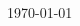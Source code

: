 \documentclass[10pt,A4,english]{article}
\begin{document}
\begin{paracol}{2}
\begin{rightcolumn}
\hspace{1cm}   \hrulefill


\hspace*{30mm}\phantom{Henok, \today }\today

\end{rightcolumn}
\end{paracol}
\end{document}
